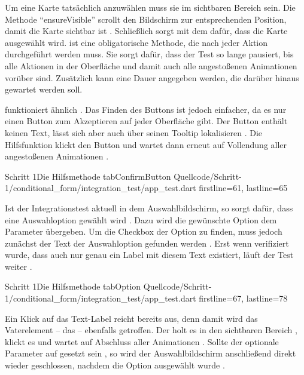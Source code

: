 Um eine Karte tatsächlich anzuwählen muss sie im sichtbaren Bereich sein.
Die Methode \enquote{ensureVisible} scrollt den Bildschirm zur entsprechenden Position, damit die Karte sichtbar ist .
Schließlich sorgt  mit dem   dafür, dass die Karte ausgewählt wird.   ist eine obligatorische Methode, die nach jeder Aktion durchgeführt werden muss. Sie sorgt dafür, dass der Test so lange pausiert, bis alle Aktionen in der Oberfläche und damit auch alle angestoßenen Animationen vorüber sind. Zusätzlich kann eine Dauer angegeben werden, die darüber hinaus gewartet werden soll. 

 funktioniert ähnlich \Lst{\ref{lst:Schritt1HilfsmethodeTabSelectionCard}}.
Das Finden des Buttons ist jedoch einfacher, da es nur einen Button zum Akzeptieren auf jeder Oberfläche gibt.
Der Button enthält keinen Text, lässt sich aber auch über seinen Tooltip lokalisieren .
Die Hilfsfunktion klickt den Button  und wartet dann erneut auf Vollendung aller angestoßenen Animationen .

\begin{alexlisting}{Schritt 1}{Die Hilfsmethode tabConfirmButton}
  {Quellcode/Schritt-1/conditional_form/integration_test/app_test.dart}
  {firstline=61, lastline=65}
  \label{lst:Schritt1HilfsmethodeTabSelectionCard}
\end{alexlisting}

Ist der Integrationstest aktuell in dem Auswahlbildschirm, so sorgt  dafür, dass eine Auswahloption gewählt wird \Lst{\ref{lst:Schritt1HilfsmethodeTabOption}}.
Dazu wird die gewünschte Option dem Parameter  übergeben.
Um die Checkbox der Option zu finden, muss jedoch zunächst der Text der Auswahloption gefunden werden .
Erst wenn verifiziert wurde, dass auch nur genau ein Label mit diesem Text existiert, läuft der Test weiter . 

\begin{alexlisting}{Schritt 1}{Die Hilfsmethode tabOption}
  {Quellcode/Schritt-1/conditional_form/integration_test/app_test.dart}
  {firstline=67, lastline=78}
  \label{lst:Schritt1HilfsmethodeTabOption}
\end{alexlisting}

Ein Klick auf das Text-Label reicht bereits aus, denn damit wird das Vaterelement -- das  -- ebenfalls getroffen.
Der  holt es in den sichtbaren Bereich , klickt es  und wartet auf Abschluss aller Animationen .
Sollte der optionale Parameter  auf  gesetzt sein , so wird der Auswahlbildschirm anschließend direkt wieder geschlossen, nachdem die Option ausgewählt wurde  . 
  
